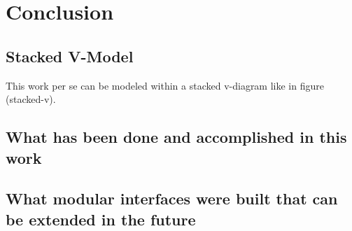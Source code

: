 \chapter{Conclusion}

	\section{Stacked V-Model}
This work per se can be modeled within a stacked v-diagram like in figure (stacked-v).

\section{What has been done and accomplished in this work}

\section{What modular interfaces were built that can be extended in the future}



